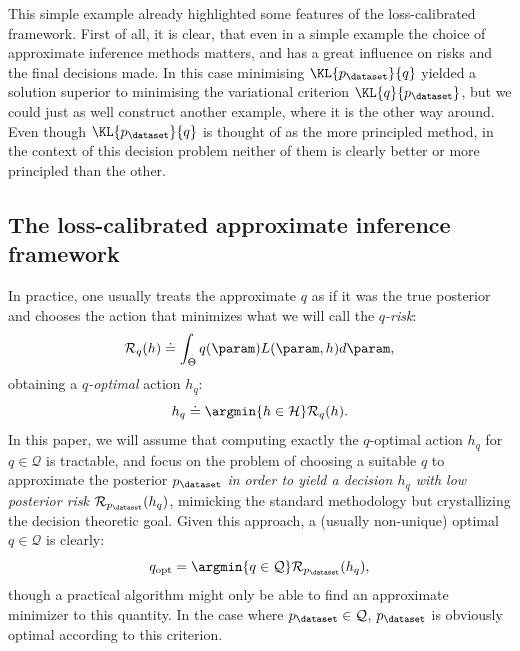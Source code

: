 This simple example already highlighted some features of the loss-calibrated framework. First of all, it is clear, that even in a simple example the choice of approximate inference methods matters, and has a great influence on risks and the final decisions made. In this case minimising $\KL{p_\dataset}{q}$ yielded a solution superior to minimising the variational criterion $\KL{q}{p_\dataset}$, but we could just as well construct another example, where it is the other way around. Even though $\KL{p_\dataset}{q}$ is thought of as the more principled method, in the context of this decision problem neither of them is clearly better or more principled than the other.

\subsection{The loss-calibrated approximate inference framework}

In practice, one usually treats the approximate $q$ as if it was the true posterior and chooses the action that minimizes what we will call the \emph{$q$-risk}:
\begin{equation} \label{e:q-risk}
	\mathcal{R}_q(h) \doteq \int_\Theta q(\param) L(\param,h) d\param ,
\end{equation}
obtaining a \emph{$q$-optimal} action $h_q$:
\begin{equation}
	h_q \doteq \argmin{h \in \mathcal{H}} \mathcal{R}_q(h).
\end{equation}
In this paper, we will assume that computing exactly the $q$-optimal action $h_q$ for $q \in \mathcal{Q}$ is tractable, and focus on the problem of choosing a suitable $q$ to approximate the posterior $p_\dataset$ \emph{in order to yield a decision $h_q$ with low posterior risk $\mathcal{R}_{p_\dataset}(h_q)$}, mimicking the standard methodology but crystallizing the decision theoretic goal. Given this approach, a (usually non-unique) optimal $q \in \mathcal{Q}$ is clearly:
\begin{equation}
	q_\mathrm{opt} = \argmin{q \in \mathcal{Q}} \mathcal{R}_{p_\dataset}(h_q),
\end{equation}
though a practical algorithm might only be able to find an approximate minimizer to this quantity. In the case where $p_\dataset\in\mathcal{Q}$, $p_\dataset$ is obviously optimal according to this criterion.


